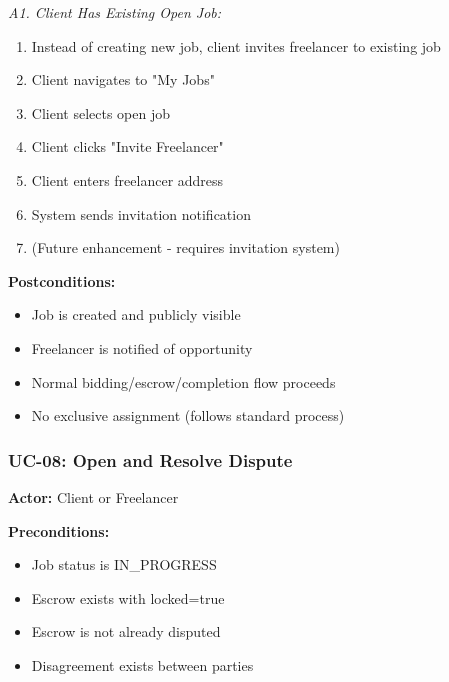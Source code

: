 \documentclass[a4paper,13pt,twoside]{report}
\theoremstyle{definition}
\begin{document}
\textit{A1. Client Has Existing Open Job:}
\begin{enumerate}
    \item Instead of creating new job, client invites freelancer to existing job
    \item Client navigates to "My Jobs"
    \item Client selects open job
    \item Client clicks "Invite Freelancer"
    \item Client enters freelancer address
    \item System sends invitation notification
    \item (Future enhancement - requires invitation system)
\end{enumerate}

\textbf{Postconditions:}
\begin{itemize}
    \item Job is created and publicly visible
    \item Freelancer is notified of opportunity
    \item Normal bidding/escrow/completion flow proceeds
    \item No exclusive assignment (follows standard process)
\end{itemize}

\subsubsection{UC-08: Open and Resolve Dispute}

\textbf{Actor:} Client or Freelancer

\textbf{Preconditions:}
\begin{itemize}
    \item Job status is IN\_PROGRESS
    \item Escrow exists with locked=true
    \item Escrow is not already disputed
    \item Disagreement exists between parties
\end{itemize}
\end{document}
